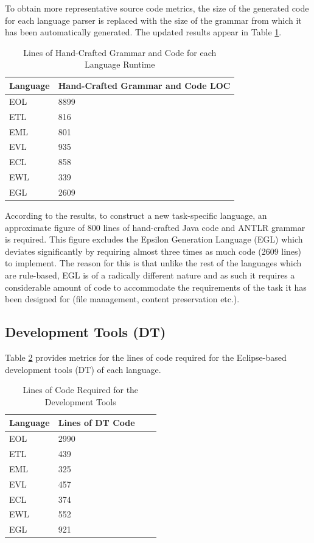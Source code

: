 To obtain more representative source code metrics, the size of the generated code for each language parser is replaced with the size of the grammar from which it has been automatically generated. The updated results appear in Table \ref{tab:HandCraftedCode}.

\begin{table}
	\centering
		\begin{tabular}{|l|l|}\hline
			\textbf{Language} & \textbf{Hand-Crafted Grammar and Code LOC} \\\hline
		EOL	& 8899 \\\hline
		ETL	& 816 \\\hline
		EML	& 801 \\\hline
		EVL	& 935 \\\hline
		ECL	& 858 \\\hline
		EWL	& 339 \\\hline
		EGL	& 2609 \\\hline
		\end{tabular}
	\caption{Lines of Hand-Crafted Grammar and Code for each Language Runtime}
	\label{tab:HandCraftedCode}
\end{table}

According to the results, to construct a new task-specific language, an approximate figure of 800 lines of hand-crafted Java code and ANTLR grammar is required. This figure excludes the Epsilon Generation Language (EGL) which deviates significantly by requiring almost three times as much code (2609 lines) to implement. The reason for this is that unlike the rest of the languages which are rule-based, EGL is of a radically different nature and as such it requires a considerable amount of code to accommodate the requirements of the task it has been designed for (file management, content preservation etc.).

\subsection{Development Tools (DT)}

Table \ref{tab:DTCode} provides metrics for the lines of code required for the Eclipse-based development tools (DT) of each language.

\begin{table}
	\centering
		\begin{tabular}{|l|l|l|l|}\hline
			\textbf{Language} & \textbf{Lines of DT Code} \\\hline
		EOL	& 2990\\\hline
		ETL	&	439 \\\hline
		EML	&	325 \\\hline
		EVL	&	457 \\\hline
		ECL	&	374 \\\hline
		EWL	&	552 \\\hline
		EGL	&	921 \\\hline
		\end{tabular}
	\caption{Lines of Code Required for the Development Tools}
	\label{tab:DTCode}
\end{table}

